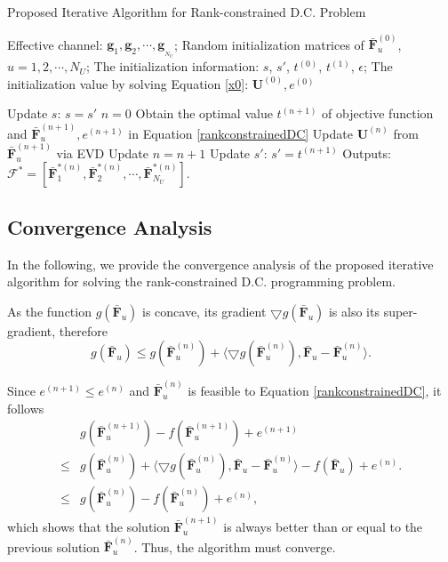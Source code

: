 \documentclass[10pt,journal,twocolumn,twoside]{IEEEtran}
\begin{document}
\begin{algorithm}[h] 		
	\caption{Proposed Iterative Algorithm for Rank-constrained D.C. Problem}
	\label{beam_cluster}
	\begin{algorithmic}
		\REQUIRE  \quad
		\STATE Effective channel: $\bm{g}_{1},\bm{g}_{2},\cdots,\bm{g}_{_{N_U}}$;
		\STATE Random initialization matrices of $\bar{\bm{F}}_u^{(0)}$, $u = 1,2,\cdots, N_U$;
		\STATE The initialization information: $s$, $s'$, $t^{(0)}$, $t^{(1)}$, $\epsilon$;
		\STATE The initialization value by solving Equation \eqref{x0}: $\bm{U}^{(0)}, e^{(0)}$
		\ENSURE
	\end{algorithmic}		
	\begin{algorithmic}[1]
		\STATE Update $s$: $s = s'$
		\STATE $n = 0$
       	\STATE Obtain the optimal value $t^{(n+1)}$ of objective function and $\bar{\bm{F}}^{(n+1)}_u, e^{(n+1)}$ in Equation \eqref{rankconstrainedDC}
       	\STATE Update $\bm{U}^{(n)}$ from $\bar{\bm{F}}^{(n+1)}_u$ via EVD
       	\STATE Update $n = n+1$
       	\ENDWHILE
		\ENDFOR
		\STATE Update $s'$: $s' = t^{(n+1)}$
		\ENDWHILE
		\STATE Outputs: $\bm{\mathcal{F}}^* =[\bar{\bm{F}}^{*(n)}_1, \bar{\bm{F}}^{*(n)}_2,\cdots, \bar{\bm{F}}^{*(n)}_{N_U}] $.
	\end{algorithmic}
\end{algorithm}


\subsection{Convergence Analysis}
In the following, we provide the convergence analysis of the proposed iterative algorithm for solving the rank-constrained D.C. programming problem.

As the function $g(\bar{\bm{F}}_u)$ is concave, its gradient $\bigtriangledown g(\bar{\bm{F}}_u)$ is also its super-gradient, therefore
\begin{equation}
	g(\bar{\bm{F}}_u)\leq g(\bar{\bm{F}}^{(n)}_u) + \langle \bigtriangledown g(\bar{\bm{F}}^{(n)}_u), \bar{\bm{F}}_u -  \bar{\bm{F}}_u^{(n)} \rangle.
\end{equation}

Since $ e^{(n+1)} \leq e^{(n)}$ and $\bar{\bm{F}}_u^{(n)}$ is feasible to Equation \eqref{rankconstrainedDC}, it follows
\begin{align}
&g(\bar{\bm{F}}^{(n+1)}_u)  - f(\bar{\bm{F}}^{(n+1)}_u)  + e^{(n+1)} \\
\leq&g(\bar{\bm{F}}^{(n)}_u) + \langle \bigtriangledown g(\bar{\bm{F}}^{(n)}_u), \bar{\bm{F}}_u -  \bar{\bm{F}}_u^{(n)} \rangle - f(\bar{\bm{F}}_u) + e^{(n)}.\nonumber\\
\leq &g(\bar{\bm{F}}^{(n)}_u)  - f(\bar{\bm{F}}^{(n)}_u)  + e^{(n)}, \nonumber
\end{align}
which shows that the solution $\bar{\bm{F}}^{(n+1)}_u$ is always better than or equal to the previous solution $\bar{\bm{F}}^{(n)}_u$. Thus, the algorithm must converge.
\end{document}
